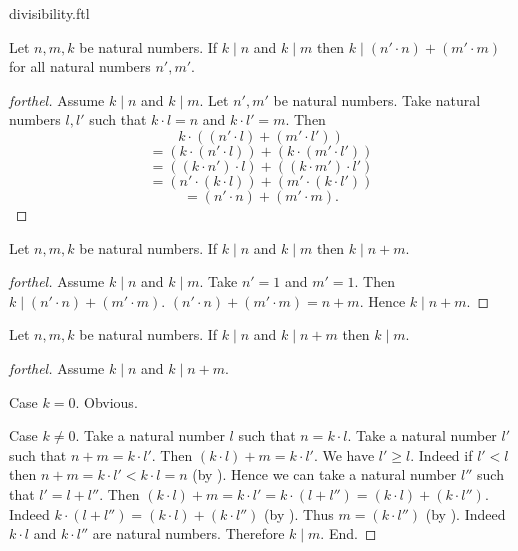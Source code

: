 \documentclass{naproche-library}
\begin{document}
\begin{smodule}[title=Divisibility]{divisibility.ftl}
\begin{proposition}[forthel,id=ARITHMETIC_07_4700711333920768]
  Let $n, m, k$ be natural numbers.
  If $k \mid n$ and $k \mid m$ then $k \mid (n' \cdot n) + (m' \cdot m)$
  for all natural numbers $n', m'$.
\end{proposition}
\begin{proof}[forthel]
  Assume $k \mid n$ and $k \mid m$.
  Let $n', m'$ be natural numbers.
  Take natural numbers $l,l'$ such that $k \cdot l = n$ and $k \cdot l' = m$.
  Then
  \[  k \cdot ((n' \cdot l) + (m' \cdot l'))                \]
  \[    = (k \cdot (n' \cdot l)) + (k \cdot (m' \cdot l'))  \]
  \[    = ((k \cdot n') \cdot l) + ((k \cdot m') \cdot l')  \]
  \[    = (n' \cdot (k \cdot l)) + (m' \cdot (k \cdot l'))  \]
  \[    = (n' \cdot n) + (m' \cdot m).                      \]
\end{proof}

\begin{corollary}[forthel,id=ARITHMETIC_07_1556786209357824]
  Let $n, m, k$ be natural numbers.
  If $k \mid n$ and $k \mid m$ then $k \mid n + m$.
\end{corollary}
\begin{proof}[forthel]
  Assume $k \mid n$ and $k \mid m$.
  Take $n' = 1$ and $m' = 1$.
  Then $k \mid (n' \cdot n) + (m' \cdot m)$.
  $(n' \cdot n) + (m' \cdot m) = n + m$.
  Hence $k \mid n + m$.
\end{proof}

\begin{proposition}[forthel,id=ARITHMETIC_07_1076947887063040]
  Let $n, m, k$ be natural numbers.
  If $k \mid n$ and $k \mid n + m$ then $k \mid m$.
\end{proposition}
\begin{proof}[forthel]
  Assume $k \mid n$ and $k \mid n + m$.

  Case $k = 0$. Obvious.

  Case $k \neq 0$.
    Take a natural number $l$ such that $n = k \cdot l$.
    Take a natural number $l'$ such that $n + m = k \cdot l'$.
    Then $(k \cdot l) + m = k \cdot l'$.
    We have $l' \geq l$.
    Indeed if $l' < l$ then
    $n + m
      = k \cdot l'
      < k \cdot l
      = n$ (by ).
    Hence we can take a natural number $l''$ such that $l' = l + l''$.
    Then $(k \cdot l) + m
      = k \cdot l'
      = k \cdot (l + l'')
      = (k \cdot l) + (k \cdot l'')$.
    Indeed $k \cdot (l + l'') = (k \cdot l) + (k \cdot l'')$ (by ).
    Thus $m = (k \cdot l'')$ (by ).
    Indeed $k \cdot l$ and $k \cdot l''$ are natural numbers.
    Therefore $k \mid m$.
  End.
\end{proof}


\end{smodule}
\end{document}

